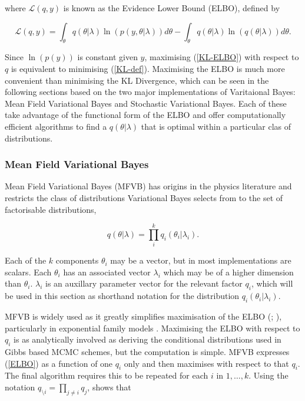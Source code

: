 \documentclass[12pt,a4paper]{article}%
\numberwithin{equation}{section}
\begin{document}
where $\mathcal{L}(q, y)$ is known as the Evidence Lower Bound (ELBO), defined by

\begin{equation}
\label{ELBO}
\mathcal{L}(q, y) = \int_{\theta} q(\theta|\lambda) \ln (p(y, \theta|\lambda)) d\theta -  \int_{\theta} q(\theta|\lambda) \ln (q(\theta|\lambda)) d\theta.
\end{equation}

Since $\ln(p(y))$ is constant given $y$, maximising (\ref{KL-ELBO}) with respect to $q$ is equivalent to minimising (\ref{KL-def}). Maximising the ELBO is much more convenient than minimising the KL Divergence, which can be seen in the following sections based on the two major implementations of Varitaional Bayes: Mean Field Variational Bayes and Stochastic Variational Bayes. Each of these take advantage of the functional form of the ELBO and offer computationally efficient algorithms to find a $q(\theta | \lambda)$ that is optimal within a particular clas of distributions. 

\subsubsection{Mean Field Variational Bayes} 

Mean Field Variational Bayes (MFVB) has origins in the physics literature \citep{Chandler1987} and restricts the class of distributions Variational Bayes selects from to the set of factorisable distributions,

\begin{equation}
\label{mf1}
q(\theta|\lambda) = \prod_i^k q_i(\theta_i | \lambda_i).
\end{equation}

Each of the $k$ components $\theta_i$ may be a vector, but in most implementations are scalars. Each $\theta_i$ has an associated vector $\lambda_i$ which may be of a higher dimension than $\theta_i$. $\lambda_i$ is an auxillary parameter vector for the relevant factor $q_i$, which will be used in this section as shorthand notation for the distribution $q_i(\theta_i |\lambda_i)$. 

MFVB is widely used as it greatly simplifies maximisation of the ELBO (\citealp{Jordan1999}; \citealp{Bishop2006}), particularly in exponential family models \citep{Wainwright2008}.  Maximising the ELBO with respect to $q_i$ is as analytically involved as deriving the conditional distributions used in Gibbs based MCMC schemes, but the computation is simple. MFVB expresses (\ref{ELBO}) as a function of one $q_i$ only and then maximises with respect to that $q_i$. The final algorithm requires this to be repeated for each $i$ in $1, \dots, k$. Using the notation $q_{\setminus i} = \prod_{j\neq i}q_j$, \citet{Attias1999} shows that 
\end{document}

